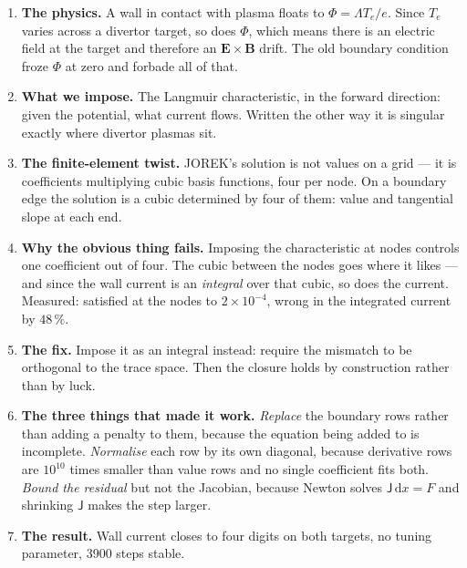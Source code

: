 \documentclass[11pt,a4paper]{article}
\newcommand{\dd}{\mathrm{d}}
\begin{document}
\begin{enumerate}\itemsep5pt
\item \textbf{The physics.} A wall in contact with plasma floats to $\Phi=\Lambda T_e/e$. Since $T_e$
  varies across a divertor target, so does $\Phi$, which means there is an electric field at the
  target and therefore an $\bm{E}\times\bm{B}$ drift. The old boundary condition froze $\Phi$ at zero
  and forbade all of that.

\item \textbf{What we impose.} The Langmuir characteristic, in the forward direction: given the
  potential, what current flows. Written the other way it is singular exactly where divertor plasmas
  sit.

\item \textbf{The finite-element twist.} JOREK's solution is not values on a grid --- it is
  coefficients multiplying cubic basis functions, four per node. On a boundary edge the solution is a
  cubic determined by four of them: value and tangential slope at each end.

\item \textbf{Why the obvious thing fails.} Imposing the characteristic at nodes controls one
  coefficient out of four. The cubic between the nodes goes where it likes --- and since the wall
  current is an \emph{integral} over that cubic, so does the current. Measured: satisfied at the nodes
  to $2\times10^{-4}$, wrong in the integrated current by $48\,\%$.

\item \textbf{The fix.} Impose it as an integral instead: require the mismatch to be orthogonal to the
  trace space. Then the closure holds by construction rather than by luck.

\item \textbf{The three things that made it work.} \emph{Replace} the boundary rows rather than adding
  a penalty to them, because the equation being added to is incomplete. \emph{Normalise} each row by
  its own diagonal, because derivative rows are $10^{10}$ times smaller than value rows and no single
  coefficient fits both. \emph{Bound the residual} but not the Jacobian, because Newton solves
  $\mathsf{J}\,\dd x = F$ and shrinking $\mathsf{J}$ makes the step larger.

\item \textbf{The result.} Wall current closes to four digits on both targets, no tuning parameter,
  3900 steps stable.
\end{enumerate}
\end{document}
